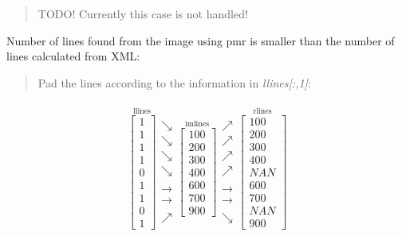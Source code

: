 \documentclass[letterpaper,10pt,english]{sphinxmanual}
\begin{document}
\begin{fulllineitems}
\begin{fulllineitems}
\begin{description}
\begin{quote}
TODO! Currently this case is not handled!
\end{quote}

Number of lines found from the image using pmr is smaller than
the number of lines calculated from XML:
\begin{quote}

Pad the lines according to the information in \emph{llines{[}:,1{]}}:
\end{quote}
\begin{gather}
\begin{split}\stackrel{\mbox{llines}}{ \begin{bmatrix} 1 \\ 1 \\ 1 \\ 1 \\ 0 \\ 1 \\ 1 \\ 0 \\ 1 \end{bmatrix} }
\begin{matrix} \searrow \\ \searrow \\ \searrow \\ \searrow \\ ~ \\ \longrightarrow \\ \longrightarrow \\ ~ \\ \nearrow \end{matrix}
\stackrel{\mbox{imlines}}{ \begin{bmatrix} 100 \\ 200 \\ 300 \\ 400 \\ 600 \\ 700 \\ 900 \end{bmatrix} }
\begin{matrix} \nearrow \\ \nearrow \\ \nearrow \\ \nearrow \\ ~ \\ \longrightarrow \\ \longrightarrow \\ ~ \\ \searrow \end{matrix}
\stackrel{\mbox{rlines}}{ \begin{bmatrix} 100 \\ 200 \\ 300 \\ 400 \\ NAN \\ 600 \\ 700 \\ NAN \\ 900 \end{bmatrix} } \\

\end{split}
\end{gather}
\end{description}
\end{fulllineitems}
\end{fulllineitems}
\end{document}
